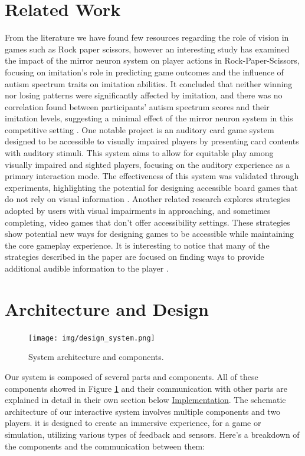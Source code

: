 \documentclass[11pt,a4paper]{report}
\begin{document}
\section*{Related Work}

From the literature we have found few resources regarding the role of vision in games such as Rock paper scissors, however an interesting study has examined the impact of the mirror neuron system on player actions in Rock-Paper-Scissors, focusing on imitation's role in predicting game outcomes and the influence of autism spectrum traits on imitation abilities. It concluded that neither winning nor losing patterns were significantly affected by imitation, and there was no correlation found between participants' autism spectrum scores and their imitation levels, suggesting a minimal effect of the mirror neuron system in this competitive setting \cite*{4}.
One notable project is an auditory card game system designed to be accessible to visually impaired players by presenting card contents with auditory stimuli. This system aims to allow for equitable play among visually impaired and sighted players, focusing on the auditory experience as a primary interaction mode. The effectiveness of this system was validated through experiments, highlighting the potential for designing accessible board games that do not rely on visual information \cite*{3} .
Another related research explores strategies adopted by users with visual impairments in approaching, and sometimes completing, video games that don't offer accessibility settings. These strategies show potential new ways for designing games to be accessible while maintaining the core gameplay experience. It is interesting to notice that many of the strategies described in the paper are focused on finding ways to provide additional audible information to the player \cite*{5}.

\section*{Architecture and Design}
\begin{figure}[htbp]
  \centering
  \texttt{[image: img/design\_system.png]}
  \caption{System architecture and components.}
  \label{fig:system_architecture}
\end{figure}

\noindent Our system is composed of several parts and components.
All of these components showed in Figure \ref{fig:system_architecture} and their communication with other parts are explained in detail in their own section below \hyperref[sec:Implementation]{Implementation}.
\noindent The schematic architecture of our interactive system involves multiple components and two players. it is designed to create an immersive experience, for a game or simulation, utilizing various types of feedback and sensors. Here's a breakdown of the components and the communication between them:
\end{document}
